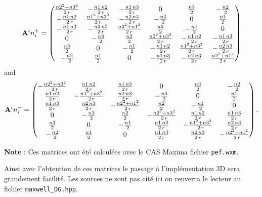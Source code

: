 \documentclass[a4paper,oneside,10pt]{report}
\begin{document}
\begin{equation}
\mathbf{A}^in_i^+=
\begin{pmatrix}
\frac{{n2}^{2}+{n3}^{2}}{2\,r} & -\frac{n1\,n2}{2\,r} & -\frac{n1\,n3}{2\,r} & 0 & \frac{n3}{2} & -\frac{n2}{2}\cr
 -\frac{n1\,n2}{2\,r} & \frac{{n1}^{2}+{n3}^{2}}{2\,r} & -\frac{n2\,n3}{2\,r} & -\frac{n3}{2} & 0 & \frac{n1}{2}\cr
 -\frac{n1\,n3}{2\,r} & -\frac{n2\,n3}{2\,r} & \frac{{n2}^{2}+{n1}^{2}}{2\,r} & \frac{n2}{2} & -\frac{n1}{2} & 0\cr
 0 & -\frac{n3}{2} & \frac{n2}{2} & \frac{{n2}^{2}+{n3}^{2}}{2\,r} & -\frac{n1\,n2}{2\,r} & -\frac{n1\,n3}{2\,r}\cr
 \frac{n3}{2} & 0 & -\frac{n1}{2} & -\frac{n1\,n2}{2\,r} & \frac{{n1}^{2}+{n3}^{2}}{2\,r} & -\frac{n2\,n3}{2\,r}\cr
 -\frac{n2}{2} & \frac{n1}{2} & 0 & -\frac{n1\,n3}{2\,r} & -\frac{n2\,n3}{2\,r} & \frac{{n2}^{2}+{n1}^{2}}{2\,r}
 \end{pmatrix}
  \end{equation}
 and
 \begin{equation}
 \mathbf{A}^in_i^-=
 \begin{pmatrix}
 -\frac{{n2}^{2}+{n3}^{2}}{2\,r} & \frac{n1\,n2}{2\,r} & \frac{n1\,n3}{2\,r} & 0 & \frac{n3}{2} & -\frac{n2}{2}\cr
 \frac{n1\,n2}{2\,r} & -\frac{{n1}^{2}+{n3}^{2}}{2\,r} & \frac{n2\,n3}{2\,r} & -\frac{n3}{2} & 0 & \frac{n1}{2}\cr 
 \frac{n1\,n3}{2\,r} & \frac{n2\,n3}{2\,r} & -\frac{{n2}^{2}+{n1}^{2}}{2\,r} & \frac{n2}{2} & -\frac{n1}{2} & 0\cr
 0 & -\frac{n3}{2} & \frac{n2}{2} & -\frac{{n2}^{2}+{n3}^{2}}{2\,r} & \frac{n1\,n2}{2\,r} & \frac{n1\,n3}{2\,r}\cr
 \frac{n3}{2} & 0 & -\frac{n1}{2} & \frac{n1\,n2}{2\,r} & -\frac{{n1}^{2}+{n3}^{2}}{2\,r} & \frac{n2\,n3}{2\,r}\cr
 -\frac{n2}{2} & \frac{n1}{2} & 0 & \frac{n1\,n3}{2\,r} & \frac{n2\,n3}{2\,r} & -\frac{{n2}^{2}+{n1}^{2}}{2\,r}
 \end{pmatrix}.
 \end{equation}


\textbf{Note} : Ces matrices ont été calculées avec le CAS Maxima fichier \texttt{pef.wxm}.

Ainsi avec l'obtention de ces matrices le passage à l'implémentation 3D sera grandement facilité. Les sources ne sont pas cité ici on renverra le lecteur au fichier \texttt{maxwell\_DG.hpp}.




\end{document}
